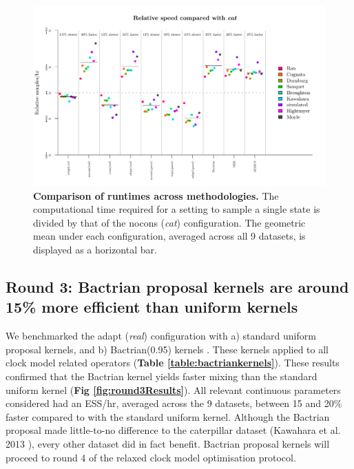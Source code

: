 \documentclass[10pt,letterpaper]{article}
\begin{document}
\begin{figure}[!h]
\includegraphics[width=\textwidth]{benchmarking/benchmarkingVM/ESS_timesettings.pdf}
\caption{\textbf{Comparison of runtimes across methodologies.} 
The computational time required for a setting to sample a single state is divided by that of the nocons (\textit{cat}) configuration.
The geometric mean under each configuration, averaged across all 9 datasets, is displayed as a horizontal bar.}
\label{fig:round2Resultsb}
\end{figure}







\subsection*{Round 3: Bactrian proposal kernels are around 15\% more efficient than uniform kernels}


We benchmarked the adapt (\textit{real}) configuration with a) standard uniform proposal kernels, and b) Bactrian(0.95) kernels \cite{yang2013searching}.
These kernels applied to all clock model related operators (\textbf{Table \ref{table:bactriankernels}}).
These results confirmed that the Bactrian kernel yields faster mixing than the standard uniform kernel (\textbf{Fig \ref{fig:round3Results}}).
All relevant continuous parameters considered had an ESS/hr, averaged across the 9 datasets, between 15 and 20\% faster compared to with the standard uniform kernel.
Although the Bactrian proposal made little-to-no difference to the caterpillar dataset (Kawahara et al. 2013 \cite{Kawahara_2013}), every other dataset did in fact benefit.
Bactrian proposal kernels will proceed to round 4 of the relaxed clock model optimisation protocol. 
\end{document}
